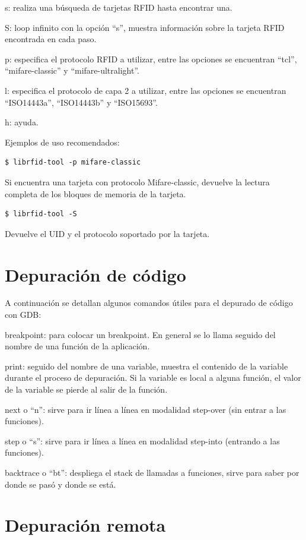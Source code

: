 s: realiza una búsqueda de tarjetas RFID hasta encontrar una.

S: loop infinito con la opción “s”, muestra información sobre la tarjeta RFID encontrada en cada paso.

p: especifica el protocolo RFID a utilizar, entre las opciones se encuentran “tcl”, “mifare-classic” y  “mifare-ultralight”.

l: especifica el protocolo de capa 2 a utilizar, entre las opciones se encuentran “ISO14443a”, “ISO14443b” y “ISO15693”.

h: ayuda.

\bigskip
Ejemplos de uso recomendados:

\begin{verbatim}
$ librfid-tool -p mifare-classic
\end{verbatim}

Si encuentra una tarjeta con protocolo Mifare-classic, devuelve la lectura completa de los bloques de memoria de la tarjeta.

\begin{verbatim}
$ librfid-tool -S
\end{verbatim}

Devuelve el UID y el protocolo soportado por la tarjeta.


\section{Depuración de código}\label{depurar}

A continuación se detallan algunos comandos útiles para el depurado de código con GDB:

breakpoint: para colocar un breakpoint. En general se lo llama seguido del nombre de una función de la aplicación.

print: seguido del nombre de una variable, muestra el contenido de la variable durante el proceso de depuración. Si la variable es local a alguna función, el valor de la variable se pierde al salir de la función.

next o “n”: sirve para ir línea a línea en modalidad step-over (sin entrar a las funciones).

step o “s”: sirve para ir línea a línea en modalidad step-into (entrando a las funciones).

backtrace o “bt”: despliega el stack de llamadas a funciones, sirve para saber por donde se pasó y donde se está.

\newpage
\section{Depuración remota}\label{GDB}

